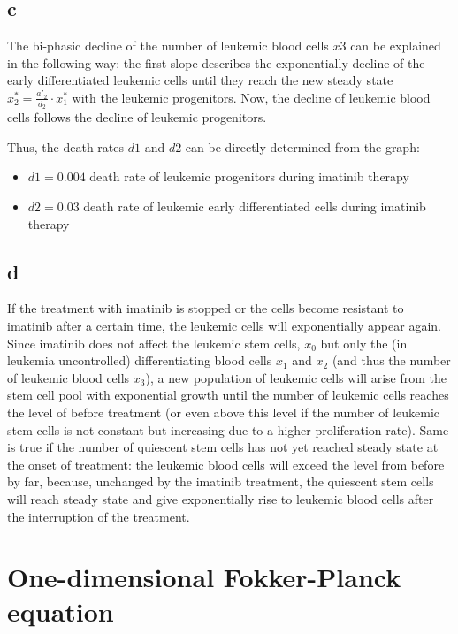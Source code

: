 \subsection{c}

The bi-phasic decline of the number of leukemic blood cells $x3$ can be explained in the
following way: the first slope describes the exponentially decline of the early differentiated leukemic
cells until they reach the new steady state $x^*_2 = \frac{a'_2}{d_2} \cdot x^*_1$ with the leukemic progenitors. Now, the decline of leukemic blood cells follows the decline of leukemic progenitors. 

Thus, the death rates $d1$ and $d2$ can be directly determined from the graph:
\begin{itemize}
\item $d1 = 0.004$  death rate of leukemic progenitors during imatinib therapy
\item $d2 = 0.03$  death rate of leukemic early differentiated cells during imatinib therapy
\end{itemize}

\subsection{d}

If the treatment with imatinib is stopped or the cells become resistant to imatinib after a certain time, the leukemic cells will exponentially appear again. Since imatinib does not affect the leukemic stem cells, $x_0$ but only the (in leukemia uncontrolled) differentiating blood cells $x_1$ and $x_2$ (and thus the number of leukemic blood cells $x_3$), a new population of leukemic cells will arise from the stem cell pool with exponential growth until the number of leukemic cells reaches the level of before treatment (or even above this level if the number of leukemic stem cells is not constant but increasing due to a higher proliferation rate).
Same is true if the number of quiescent stem cells has not yet reached steady state at the onset of treatment: the leukemic blood cells will exceed the level from before by far, because, unchanged by the imatinib treatment, the quiescent stem cells will reach steady state and give exponentially rise to leukemic blood cells after the interruption of the treatment.

\setcounter{chapter}{4}
\setcounter{section}{0}
\section{One-dimensional Fokker-Planck equation}

